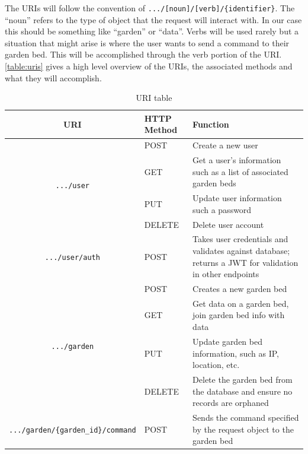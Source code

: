 The URIs will follow the convention of \verb|.../[noun]/[verb]/{identifier}|. The ``noun'' refers to the type of object that the request will interact with. In our case this should be something like ``garden'' or ``data''. Verbs will be used rarely but a situation that might arise is where the user wants to send a command to their garden bed. This will be accomplished through the verb portion of the URI. \autoref{table:uris} gives a high level overview of the URIs, the associated methods and what they will accomplish.
\begin{table}[H]
    \centering
    \begin{tabular}{c|p{2cm}|p{6cm}}
        \hline
        \textbf{URI} & \textbf{HTTP Method} & \textbf{Function} \\
        \hline
        \multirow{4}{*}{\texttt{.../user}} & POST & Create a new user \\\cline{2-3}
                                           & GET & Get a user's information such as a list of associated garden beds\\\cline{2-3}
                                           & PUT & Update user information such a password \\\cline{2-3}
                                           & DELETE & Delete user account \\\hline
        \texttt{.../user/auth} & POST & Takes user credentials and validates against database; returns a JWT for validation in other endpoints \\
        \hline
        \multirow{4}{*}{\texttt{.../garden}} & POST & Creates a new garden bed \\\cline{2-3}
                          & GET & Get data on a garden bed, join garden bed info with data  \\\cline{2-3}
                          & PUT & Update garden bed information, such as IP, location, etc. \\\cline{2-3}
                          & DELETE & Delete the garden bed from the database and ensure no records are orphaned \\\hline
        \texttt{.../garden/\{garden\_id\}/command} & POST & Sends the command specified by the request object to the garden bed \\
        \hline
    \end{tabular}
    \caption{URI table}
    \label{table:uris}
\end{table}
